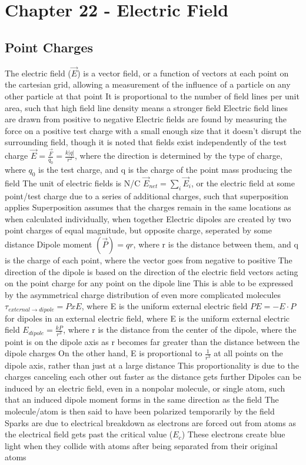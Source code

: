 \documentclass[11 pt, twoside]{article}
\newenvironment{outline*}
{
	\begin{outline}[enumerate]
	}
	{\end{outline}
}
\begin{document}
\section{Chapter 22 - Electric Field}
\subsection{Point Charges}
\begin{outline*}
\1 The electric field ($\vec{E}$) is a vector field, or a function of vectors at each point on the cartesian grid, allowing a measurement of the influence of a particle on any other particle at that point
\2 It is proportional to the number of field lines per unit area, such that high field line density means a stronger field
\3 Electric field lines are drawn from positive to negative
\2 Electric fields are found by measuring the force on a positive test charge with a small enough size that it doesn't disrupt the surrounding field, though it is noted that fields exist independently of the test charge
\1 $\vec{E} = \frac{\vec{F}}{q_0} = \frac{k|q|}{r^2}$, where the direction is determined by the type of charge, where $q_0$ is the test charge, and q is the charge of the point mass producing the field
\2 The unit of electric fields is N/C
\2 $\vec{E}_{net} = \sum_i \vec{E}_i$, or the electric field at some point/test charge due to a series of additional charges, such that superposition applies
\3 Superposition assumes that the charges remain in the same locations as when calculated individually, when together
\1 Electric dipoles are created by two point charges of equal magnitude, but opposite charge, seperated by some distance
\2 Dipole moment $(\vec{P}) = qr$, where r is the distance between them, and q is the charge of each point, where the vector goes from negative to positive
\3 The direction of the dipole is based on the direction of the electric field vectors acting on the point charge for any point on the dipole line
\3 This is able to be expressed by the asymmetrical charge distribution of even more complicated molecules
\2 $\tau_{external \to dipole} = P x E$, where E is the uniform external electric field
\2 $PE = -E \cdot P$ for dipoles in an external electric field, where E is the uniform external electric field
\2 $E_{dipole} = \frac{kP}{r^3}$, where r is the distance from the center of the dipole, where the point is on the dipole axis as r becomes far greater than the distance between the dipole charges
\3 On the other hand, E is proportional to $\frac{1}{r^3}$ at all points on the dipole axis, rather than just at a large distance
\3 This proportionality is due to the charges canceling each other out faster as the distance gets further
\2 Dipoles can be induced by an electric field, even in a nonpolar molecule, or single atom, such that an induced dipole moment forms in the same direction as the field
\3 The molecule/atom is then said to have been polarized temporarily by the field
\1 Sparks are due to electrical breakdown as electrons are forced out from atoms as the electrical field gets past the critical value ($E_c$)
\2 These electrons create blue light when they collide with atoms after being separated from their original atoms
\end{outline*}
\end{document}
